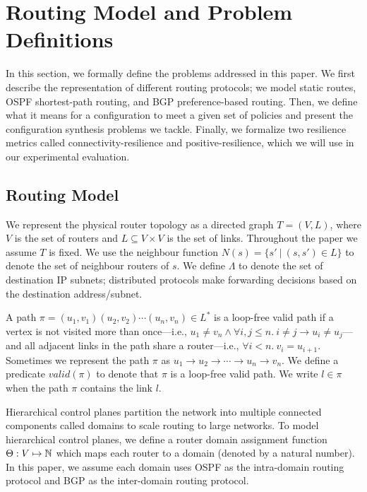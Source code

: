 \section{Routing Model and Problem Definitions}
In this section, we formally define the problems addressed in this
paper.  We first describe the representation of different
routing protocols; we model static
routes, OSPF shortest-path routing, and BGP preference-based routing.
Then, we define what it means for a configuration to meet a given
set of policies and present the configuration synthesis problems
we tackle.
Finally, we formalize two resilience metrics called 
connectivity-resilience and positive-resilience,
which we will use in our experimental evaluation.


\subsection{Routing Model}

We represent the physical router topology as a directed graph $T=(V, L)$,
where $V$ is the set of routers and $L\subseteq V\times V$ is the set of links. 
Throughout the paper we assume $T$ is fixed.
We use the neighbour function $N(s) = \{s'\ | \ (s,s') \in L \}$ to denote 
the set of neighbour routers of $s$. 
We define $\Lambda$ to denote the set of destination IP subnets;
distributed protocols make forwarding decisions based on the 
destination address/subnet.

A path $\pi = (u_1,v_1) (u_2, v_2) \cdots (u_n, v_n) \in L^*$ is a loop-free valid path if
a  vertex is not visited more than once---i.e.,
$u_1\neq v_n\wedge\forall i,j \leq n. 
~i \not= j \rightarrow u_i \not= u_j$---and all adjacent links in the
path share a router---i.e., $\forall i < n. ~v_i = u_{i+1}$.
Sometimes we represent the path $\pi$ as $u_1\rightarrow u_2 \rightarrow  \cdots \rightarrow u_n \rightarrow v_n$.
We define a predicate $valid(\pi)$ to denote that $\pi$
is a loop-free valid path. 
We write $l \in \pi$ when the path $\pi$ contains the link $l$. 

Hierarchical control planes partition the
network into multiple connected components called domains 
to scale routing to large networks. To model hierarchical 
control planes, 
we define a router domain assignment function
$\Theta: V \mapsto \mathbb{N}$ which maps each router to a domain 
(denoted by a natural number). In this paper, we assume 
each domain uses OSPF as the intra-domain routing protocol
and BGP as the inter-domain routing protocol. 

